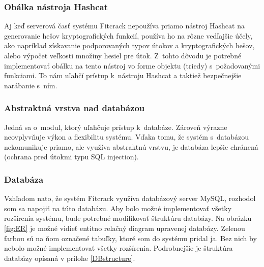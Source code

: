 \documentclass[slovak]{fitthesis}
\begin{document}
\subsubsection{Obálka nástroja Hashcat}
Aj keď serverová časť systému Fitcrack nepoužíva priamo nástroj Hashcat na generovanie hešov kryptografických funkcií, používa ho na rôzne vedľajšie účely, ako napríklad získavanie podporovaných typov útokov a kryptografických hešov, alebo výpočet veľkosti množiny hesiel pre útok. Z~tohto dôvodu je potrebné implementovať obálku na tento nástroj vo forme objektu (triedy) s~požadovanými funkciami. To nám uľahčí prístup k~nástroju Hashcat a taktiež bezpečnejšie narábanie s~ním.

\subsubsection{Abstraktná vrstva nad databázou}
Jedná sa o~modul, ktorý uľahčuje prístup k~databáze. Zároveň výrazne neovplyvňuje výkon a flexibilitu systému. Vďaka tomu, že systém s~databázou nekomunikuje priamo, ale využíva abstraktnú vrstvu, je databáza lepšie chránená (ochrana pred útokmi typu SQL injection).


\subsubsection{Databáza}\label{navrhDB}
Vzhľadom nato, že systém Fitcrack využíva databázový server MySQL, rozhodol som sa napojiť na túto databázu. Aby bolo možné implementovať všetky rozšírenia systému, bude potrebné modifikovať štruktúru databázy. Na obrázku \ref{fig:ER} je možné vidieť entitno relačný diagram upravenej databázy. Zelenou farbou sú na ňom označené tabuľky, ktoré som do systému pridal ja. Bez nich by nebolo možné implementovať všetky rozšírenia. Podrobnejšie je štruktúra databázy opísaná v prílohe \ref{DBstructure}.
\end{document}

